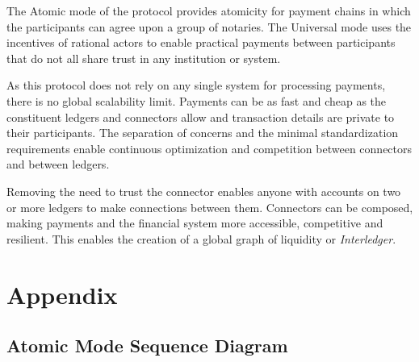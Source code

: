 \documentclass[letterpaper,twocolumn,10pt]{article}
\begin{document}
The Atomic mode of the protocol provides atomicity for payment chains in which the participants can agree upon a group of notaries. The Universal mode uses the incentives of rational actors to enable practical payments between participants that do not all share trust in any institution or system.

As this protocol does not rely on any single system for processing payments, there is no global scalability limit. Payments can be as fast and cheap as the constituent ledgers and connectors allow and transaction details are private to their participants. The separation of concerns and the minimal standardization requirements enable continuous optimization and competition between connectors and between ledgers.

Removing the need to trust the connector enables anyone with accounts on two or more ledgers to make connections between them. Connectors can be composed, making payments and the financial system more accessible, competitive and resilient. This enables the creation of a global graph of liquidity or \textit{Interledger}.





{\footnotesize 
}

\clearpage
\appendix
\section{Appendix}

\subsection{Atomic Mode Sequence Diagram}
\label{sec:atomic-sequence}
\end{document}
